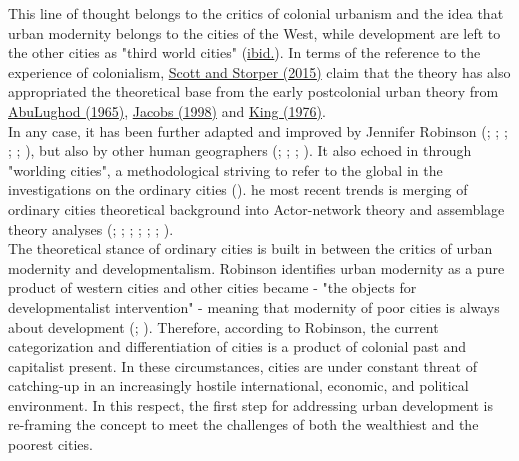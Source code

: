 \documentclass[11pt]{report}
\begin{document}
This line of thought belongs to the critics of colonial urbanism and the idea that  urban  modernity belongs to the cities of the West, while development are left to the other cities as "third world cities" (\href{Robinson}{ibid.}).
In terms of the reference to the experience of colonialism, \href{Scott}{Scott and Storper (2015)} claim that the theory has also appropriated the theoretical base from the early postcolonial urban theory from \href{Abu­Lughod????}{Abu­Lughod (1965)}, \href{Jacobs????}{Jacobs (1998)} and \href{King????}{King (1976)}.
\\

In any case, it has been further adapted and improved by Jennifer Robinson
(\href{Robinson}{\cite{Robinson2002}}; \href{Robinson}{\cite{Robinson2006}}; \href{Robinson}{\cite{Robinson2011}}; \href{Robinson}{\cite{Robinson2013}}; \href{Robinson}{\cite{Robinson2015}}; \href{Robinson}{\cite{Robinson2016}}),
but also by other human geographers
(\href{Amin}{\cite{AminAndGraham1997}}; \href{Roy}{\cite{Roy2011????}}; \href{Roy}{\cite{RoyAndOng2011????}}; \href{Parnell}{\cite{ParnellAndRobinson2012}}).
It also echoed in through "worlding cities", a methodological striving to refer to the global in the investigations on the ordinary cities (\href{Roy}{\cite{RoyAndOng2011}}). 
he most recent trends is merging of ordinary cities theoretical background into Actor-network theory and assemblage theory analyses
(\href{ONg}{\cite{OngANdCollier2004}}; \href{Robinson}{\cite{Robinson2004}};
\href{Sassen}{\cite{Sassen2008}}; \href{McFarlane}{\cite{McFarlane2010}}; \href{Farias}{\cite{FariasAndBender2011}}; \href{Rankin}{\cite{Rankin2011}};
\href{Scott}{\cite{ScottAndStorper2015}}).
\\

The theoretical stance of ordinary cities is built in between the critics of urban modernity and developmentalism.
Robinson identifies urban modernity as a pure product of western cities and other cities became - "the objects for developmentalist intervention" - meaning that modernity of poor cities is always about development (\href{Robinson}{\cite{Robinson2002}}; \href{Robinson}{\cite{Robinson2006}}).
Therefore, according to Robinson, the current categorization  and  differentiation  of  cities is a product of colonial past and capitalist present. 
In these circumstances, cities are under constant threat of catching-up in an increasingly hostile international, economic, and political environment. 
In this respect, the first step for addressing urban  development  is re-framing the concept to   meet  the challenges  of  both  the  wealthiest  and  the  poorest  cities.
\\
\end{document}
